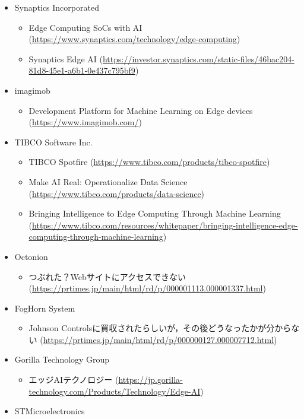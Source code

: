 \begin{itemize}
\begin{itemize}
\begin{itemize}
		\end{itemize}
		\item Synaptics Incorporated
		\begin{itemize}
			\item Edge Computing SoCs with AI (\url{https://www.synaptics.com/technology/edge-computing})
			\item Synaptics Edge AI (\url{https://investor.synaptics.com/static-files/46bac204-81d8-45e1-a6b1-0e437c795bf9})
		\end{itemize}
		\item imagimob
		\begin{itemize}
			\item Development Platform for Machine Learning on Edge devices (\url{https://www.imagimob.com/})
		\end{itemize}
		\item TIBCO Software Inc.
		\begin{itemize}
			\item TIBCO Spotfire (\url{https://www.tibco.com/products/tibco-spotfire})
			\item Make AI Real: Operationalize Data Science (\url{https://www.tibco.com/products/data-science})
			\item Bringing Intelligence to Edge Computing Through Machine Learning (\url{https://www.tibco.com/resources/whitepaper/bringing-intelligence-edge-computing-through-machine-learning})
		\end{itemize}
		\item Octonion
		\begin{itemize}
			\item つぶれた？Webサイトにアクセスできない (\url{https://prtimes.jp/main/html/rd/p/000001113.000001337.html})
		\end{itemize}
		\item FogHorn System
		\begin{itemize}
			\item Johnson Controlsに買収されたらしいが，その後どうなったかが分からない (\url{https://prtimes.jp/main/html/rd/p/000000127.000007712.html})
		\end{itemize}
		\item Gorilla Technology Group
		\begin{itemize}
			\item エッジAIテクノロジー (\url{https://jp.gorilla-technology.com/Products/Technology/Edge-AI})
		\end{itemize}
		\item STMicroelectronics
		\begin{itemize}

\end{itemize}
\end{itemize}
\end{itemize}
